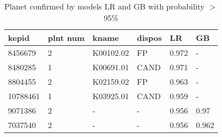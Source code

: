 \begin{table}[!htbp]
 \centering
 \caption{Planet confirmed by models LR and GB with probability $>$ 95\%}
 \label{dataLRGBcreftab} 
  \begin{tabular}
{| 
 p{}| 
 p{}| 
 p{}| 
 p{}| 
 p{}| 
 p{}| 
}\hline 
\textbf{kepid} &\textbf{plnt num} &\textbf{kname} &\textbf{dispos} &\textbf{LR} &\textbf{GB} \\ \hline 
8456679 &2 &K00102.02 &FP &0.972 &- \\ \hline 
8480285 &1 &K00691.01 &CAND &0.971 &- \\ \hline 
8804455 &2 &K02159.02 &FP &0.963 &- \\ \hline 
10788461 &1 &K03925.01 &CAND &0.959 &- \\ \hline 
9071386 &2 &- &- &0.956 &0.97 \\ \hline 
7037540 &2 &- &- &0.956 &0.962 \\ \hline 
\end{tabular} 
\end{table}